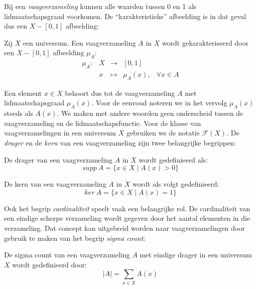 Bij een \emph{vaagverzameling} kunnen alle waarden tussen 0 en 1 als lidmaatschapsgraad 
voorkomen. De ``karakteristieke'' afbeelding is in dat geval dus een $X - [0,1]$ afbeelding:
\begin{definitie}
Zij $X$ een universum. Een vaagverzameling $A$ in $X$ wordt gekarakteriseerd door een $X - [0,1]$
afbeelding  $\mu_A$:
\begin{displaymath}
\begin{array}{lllll}
\mu_A: 	& X & \to 		& [0,1]	& \\
		& x & \mapsto 	& \mu_A(x),		& \forall x \in A
\end{array}
\end{displaymath}
\end{definitie}
\noindent
Een element $x \in X$ behoort dus tot de vaagverzameling $A$ met lidmaatschapsgraad $\mu_A(x)$.
Voor de eenvoud noteren we in het vervolg $\mu_A(x)$ steeds als $A(x)$. We maken
met andere woorden geen onderscheid tussen de vaagverzameling en de 
lidmaatschapsfunctie. Voor de klasse van vaagverzamelingen in een universum $X$ gebruiken we
de notatie $\mathcal{F}(X)$.
De \emph{drager} en de \emph{kern} van een vaagverzameling zijn twee belangrijke begrippen: 
\begin{definitie}
De drager van een vaagverzameling $A$ in $X$ wordt gedefinieerd als:
\begin{displaymath}
supp\ A = \{x \in X \mid A(x) > 0\} 
\end{displaymath}
\end{definitie}
\begin{definitie}
De kern van een vaagverzameling $A$ in $X$ wordt als volgt gedefinieerd:
\begin{displaymath}
ker\ A = \{x \in X \mid A(x) = 1\}
\end{displaymath}
\end{definitie}
\noindent
Ook het begrip \emph{cardinaliteit} speelt vaak een belangrijke rol. De cardinaliteit van een 
eindige scherpe verzameling wordt gegeven door het aantal elementen in die verzameling. 
Dat concept kan uitgebreid worden naar vaagverzamelingen door gebruik te maken van het begrip 
\emph{sigma count}:
\begin{definitie}
De sigma count van een vaagverzameling $A$ met eindige drager in een universum $X$ wordt
gedefinieerd door:
\begin{displaymath}
|A|=\sum_{x \in X} A(x)
\end{displaymath}
\end{definitie}

